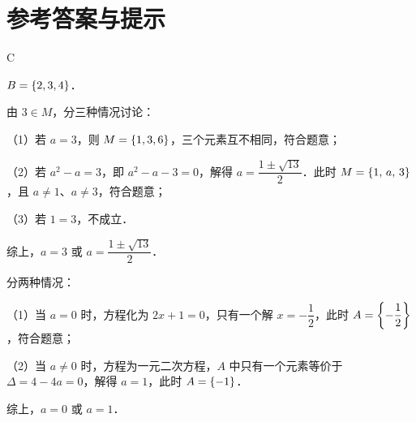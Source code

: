 
\newpage
\section*{参考答案与提示}

\quad C

\smallskip
{}\quad $B=\left\{ 2,3,4 \right\}$．

\smallskip
{}\quad 由 $3\in M$，分三种情况讨论：

（1）若 $a=3$，则 $M=\left\{ 1,3,6 \right\}$，三个元素互不相同，符合题意；

（2）若 $a^{2}-a=3$，即 $a^{2}-a-3=0$，解得 $a=\dfrac{1\pm\sqrt{13}}{2}$．此时 $M=\left\{ 1,\,a,\,3 \right\}$，且 $a\ne 1$、$a\ne 3$，符合题意；

（3）若 $1=3$，不成立．

综上，$a=3$ 或 $a=\dfrac{1\pm\sqrt{13}}{2}$．

\smallskip
{}\quad 分两种情况：

（1）当 $a=0$ 时，方程化为 $2x+1=0$，只有一个解 $x=-\dfrac{1}{2}$，此时 $A=\left\{ -\dfrac{1}{2} \right\}$，符合题意；

（2）当 $a\ne 0$ 时，方程为一元二次方程，$A$ 中只有一个元素等价于 $\Delta=4-4a=0$，解得 $a=1$，此时 $A=\left\{ -1 \right\}$．

综上，$a=0$ 或 $a=1$．
